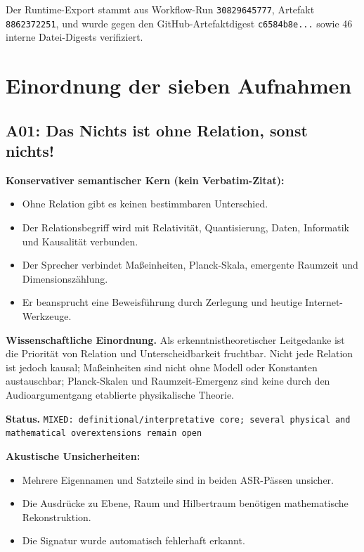 \documentclass[11pt,a4paper]{article}
\newcommand{\status}[1]{\texttt{#1}}
\begin{document}
Der Runtime-Export stammt aus Workflow-Run \texttt{30829645777}, Artefakt \texttt{8862372251}, und wurde gegen den GitHub-Artefaktdigest \texttt{c6584b8e...} sowie 46 interne Datei-Digests verifiziert.

\section{Einordnung der sieben Aufnahmen}

\subsection{A01: Das Nichts ist ohne Relation, sonst nichts!}
\label{sec:a01}
\textbf{Konservativer semantischer Kern (kein Verbatim-Zitat):}
\begin{itemize}
\item Ohne Relation gibt es keinen bestimmbaren Unterschied.
\item Der Relationsbegriff wird mit Relativität, Quantisierung, Daten, Informatik und Kausalität verbunden.
\item Der Sprecher verbindet Maßeinheiten, Planck-Skala, emergente Raumzeit und Dimensionszählung.
\item Er beansprucht eine Beweisführung durch Zerlegung und heutige Internet-Werkzeuge.
\end{itemize}

\textbf{Wissenschaftliche Einordnung.} Als erkenntnistheoretischer Leitgedanke ist die Priorität von Relation und Unterscheidbarkeit fruchtbar. Nicht jede Relation ist jedoch kausal; Maßeinheiten sind nicht ohne Modell oder Konstanten austauschbar; Planck-Skalen und Raumzeit-Emergenz sind keine durch den Audioargumentgang etablierte physikalische Theorie.

\textbf{Status.} \status{MIXED: definitional/interpretative core; several physical and mathematical overextensions remain open}

\textbf{Akustische Unsicherheiten:}
\begin{itemize}
\item Mehrere Eigennamen und Satzteile sind in beiden ASR-Pässen unsicher.
\item Die Ausdrücke zu Ebene, Raum und Hilbertraum benötigen mathematische Rekonstruktion.
\item Die Signatur wurde automatisch fehlerhaft erkannt.
\end{itemize}
\end{document}
